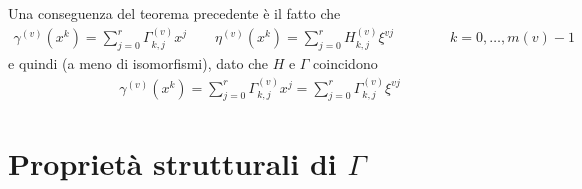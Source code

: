 Una conseguenza del teorema precedente è il fatto che
\begin{align*}
   \gamma^{(v)}(x^{k}) = \sum_{j=0}^{r} \Gamma_{k,j}^{(v)} x^{j}
   \qquad
   \eta^{(v)}(x^{k}) = \sum_{j=0}^{r} H_{k,j}^{(v)} \xi^{vj}
   \qquad\qquad
   k = 0,\dots , m(v)-1
\end{align*}
e quindi (a meno di isomorfismi), dato che $H$ e $\Gamma$ coincidono
\begin{align*}
   \gamma^{(v)}(x^{k}) = \sum_{j=0}^{r} \Gamma_{k,j}^{(v)} x^{j} = \sum_{j=0}^{r} \Gamma_{k,j}^{(v)} \xi^{vj}
\end{align*}

\section{Proprietà strutturali di $\Gamma$}

